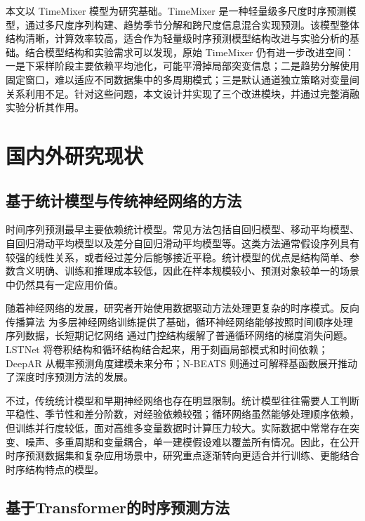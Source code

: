 本文以 TimeMixer 模型为研究基础。TimeMixer\cite{wang2023timemixer} 是一种轻量级多尺度时序预测模型，通过多尺度序列构建、趋势季节分解和跨尺度信息混合实现预测。该模型整体结构清晰，计算效率较高，适合作为轻量级时序预测模型结构改进与实验分析的基础。结合模型结构和实验需求可以发现，原始 TimeMixer 仍有进一步改进空间：一是下采样阶段主要依赖平均池化，可能平滑掉局部突变信息；二是趋势分解使用固定窗口，难以适应不同数据集中的多周期模式；三是默认通道独立策略对变量间关系利用不足。针对这些问题，本文设计并实现了三个改进模块，并通过完整消融实验分析其作用。

\section{国内外研究现状}

\subsection{基于统计模型与传统神经网络的方法}

时间序列预测最早主要依赖统计模型。常见方法包括自回归模型、移动平均模型、自回归滑动平均模型以及差分自回归滑动平均模型等\cite{box1970time}。这类方法通常假设序列具有较强的线性关系，或者经过差分后能够接近平稳。统计模型的优点是结构简单、参数含义明确、训练和推理成本较低，因此在样本规模较小、预测对象较单一的场景中仍然具有一定应用价值。

随着神经网络的发展，研究者开始使用数据驱动方法处理更复杂的时序模式。反向传播算法\cite{rumelhart1986learning} 为多层神经网络训练提供了基础，循环神经网络能够按照时间顺序处理序列数据，长短期记忆网络\cite{hochreiter1997lstm} 通过门控结构缓解了普通循环网络的梯度消失问题。LSTNet\cite{lai2018lstnet} 将卷积结构和循环结构结合起来，用于刻画局部模式和时间依赖；DeepAR\cite{salinas2020deepar} 从概率预测角度建模未来分布；N-BEATS\cite{oreshkin2020nbeats} 则通过可解释基函数展开推动了深度时序预测方法的发展。

不过，传统统计模型和早期神经网络也存在明显限制。统计模型往往需要人工判断平稳性、季节性和差分阶数，对经验依赖较强；循环网络虽然能够处理顺序依赖，但训练并行度较低，面对高维多变量数据时计算压力较大。实际数据中常常存在突变、噪声、多重周期和变量耦合，单一建模假设难以覆盖所有情况。因此，在公开时序预测数据集和复杂应用场景中，研究重点逐渐转向更适合并行训练、更能结合时序结构特点的模型。

\subsection{基于Transformer的时序预测方法}

